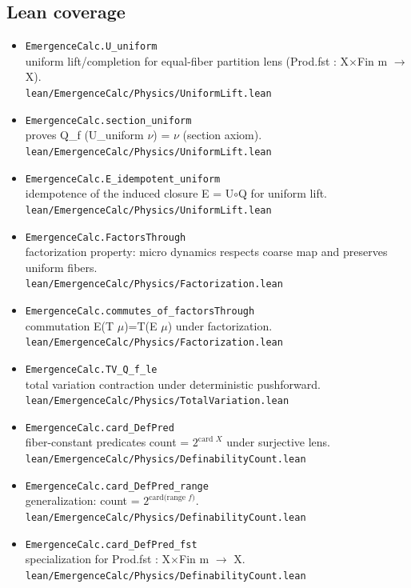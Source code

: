 \documentclass[11pt]{article}
\begin{document}
\subsection*{Lean coverage}
\begin{itemize}[leftmargin=*]
  \item \texttt{EmergenceCalc.U\_uniform}\\
    uniform lift/completion for equal-fiber partition lens (Prod.fst : X$\times$Fin m $\to$ X).\\
    {\footnotesize\texttt{lean/EmergenceCalc/Physics/UniformLift.lean}}
  \item \texttt{EmergenceCalc.section\_uniform}\\
    proves Q\_f (U\_uniform $\nu$) = $\nu$ (section axiom).\\
    {\footnotesize\texttt{lean/EmergenceCalc/Physics/UniformLift.lean}}
  \item \texttt{EmergenceCalc.E\_idempotent\_uniform}\\
    idempotence of the induced closure E = U$\circ$Q for uniform lift.\\
    {\footnotesize\texttt{lean/EmergenceCalc/Physics/UniformLift.lean}}
  \item \texttt{EmergenceCalc.FactorsThrough}\\
    factorization property: micro dynamics respects coarse map and preserves uniform fibers.\\
    {\footnotesize\texttt{lean/EmergenceCalc/Physics/Factorization.lean}}
  \item \texttt{EmergenceCalc.commutes\_of\_factorsThrough}\\
    commutation E(T $\mu$)=T(E $\mu$) under factorization.\\
    {\footnotesize\texttt{lean/EmergenceCalc/Physics/Factorization.lean}}
  \item \texttt{EmergenceCalc.TV\_Q\_f\_le}\\
    total variation contraction under deterministic pushforward.\\
    {\footnotesize\texttt{lean/EmergenceCalc/Physics/TotalVariation.lean}}
  \item \texttt{EmergenceCalc.card\_DefPred}\\
    fiber-constant predicates count = $2^{\text{card }X}$ under surjective lens.\\
    {\footnotesize\texttt{lean/EmergenceCalc/Physics/DefinabilityCount.lean}}
  \item \texttt{EmergenceCalc.card\_DefPred\_range}\\
    generalization: count = $2^{\text{card(range }f)}$.\\
    {\footnotesize\texttt{lean/EmergenceCalc/Physics/DefinabilityCount.lean}}
  \item \texttt{EmergenceCalc.card\_DefPred\_fst}\\
    specialization for Prod.fst : X$\times$Fin m $\to$ X.\\
    {\footnotesize\texttt{lean/EmergenceCalc/Physics/DefinabilityCount.lean}}
\end{itemize}
\end{document}
